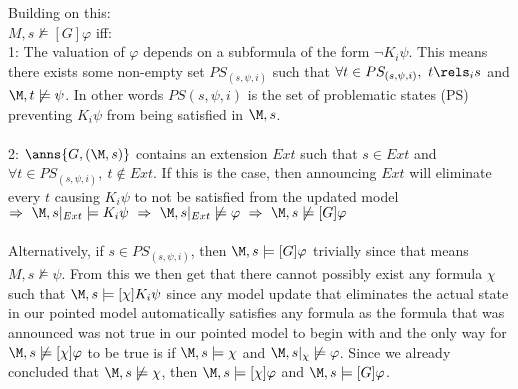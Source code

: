 Building on this:\\

$M,s\not\models[G]\varphi$ iff: \\
1: The valuation of $\varphi$ depends on a subformula of the form $\neg K_i\psi$. This means there exists some non-empty set $PS_{(s,\psi,i)}$ such that $\forall t\in PS_{(s,\psi,i)},~ t\rels_i s$ and $\M,t\not\models\psi$. In other words $PS{(s,\psi,i)}$  is the set of problematic states (PS) preventing $K_i\psi$ from being satisfied in $\M,s$.\\\\

2: $\anns{G,(\M,s)}$ contains an extension $Ext$ such that $s\in Ext$ and $\forall t\in PS_{(s,\psi,i)}, ~t \not\in Ext$. If this is the case, then announcing $Ext$ will eliminate every $t$ causing $K_i\psi$ to not be satisfied from the updated model $\Rightarrow~\M,s|_{Ext}\models K_i\psi~\Rightarrow~\M,s|_{Ext}\not\models\varphi~\Rightarrow~\M,s\not\models[G]\varphi$\\\\

Alternatively, if $s\in PS_{(s,\psi,i)}$, then $\M,s\models[G]\varphi$ trivially since that means $M,s\not\models\psi$. From this we then get that there cannot possibly exist any formula $\chi$ such that  $\M,s \models[\chi]K_i\psi$ since any model update that eliminates the actual state in our pointed model automatically satisfies any formula as the formula that was announced was not true in our pointed model to begin with and the only way for $\M,s\not\models[\chi]\varphi$ to be true is if $\M,s\models\chi$ and $\M,s|_\chi\not\models\varphi$. Since we already concluded that $\M,s\not\models\chi$, then $\M,s\models[\chi]\varphi$ and $\M,s\models[G]\varphi$.\\

